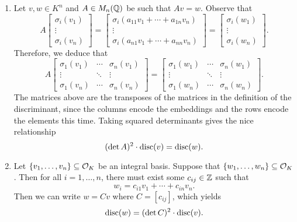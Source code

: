 \begin{enumerate}[(1)]
    \item Let $v, w \in K^n$ and $A \in M_n(\mathbb{Q})$ be such that $Av = w$. 
    Observe that 
    \[ A \begin{bmatrix} \sigma_i(v_1) \\ \vdots \\ \sigma_i(v_n) \end{bmatrix} 
    = \begin{bmatrix} \sigma_i(a_{11}v_1 + \cdots + a_{1n}v_n) \\ \vdots \\ 
        \sigma_i(a_{n1}v_1 + \cdots + a_{nn}v_n) \end{bmatrix} 
    = \begin{bmatrix} \sigma_i(w_1) \\ \vdots \\ \sigma_i(w_n) \end{bmatrix}. \] 
    Therefore, we deduce that 
    \[ A \begin{bmatrix} \sigma_1(v_1) & \cdots & \sigma_n(v_1) \\ 
        \vdots & \ddots & \vdots \\ 
        \sigma_1(v_n) & \cdots & \sigma_n(v_n) \end{bmatrix} 
    = \begin{bmatrix} \sigma_1(w_1) & \cdots & \sigma_n(w_1) \\ 
        \vdots & \ddots & \vdots \\ 
        \sigma_1(w_n) & \cdots & \sigma_n(w_n) \end{bmatrix}. \] 
    The matrices above are the transposes of the matrices in the 
    definition of the discriminant, since the columns encode the embeddings 
    and the rows encode the elements this time. Taking squared determinants 
    gives the nice relationship
    \[ (\det A)^2 \cdot \operatorname{disc}(v) = \operatorname{disc}(w). \] 

    \item Let $\{v_1, \dots, v_n\} \subseteq {\cal O}_K$ be an integral basis.
    Suppose that $\{w_1, \dots, w_n\} \subseteq {\cal O}_K$. Then 
    for all $i = 1, \dots, n$, there must exist some $c_{ij} \in \mathbb{Z}$ such that 
    \[ w_i = c_{i1} v_1 + \cdots + c_{in} v_n. \] 
    Then we can write $w = Cv$ where $C = [c_{ij}]$, which yields 
    \[ \operatorname{disc}(w) = (\det C)^2 \cdot \operatorname{disc}(v). \] 
\end{enumerate}